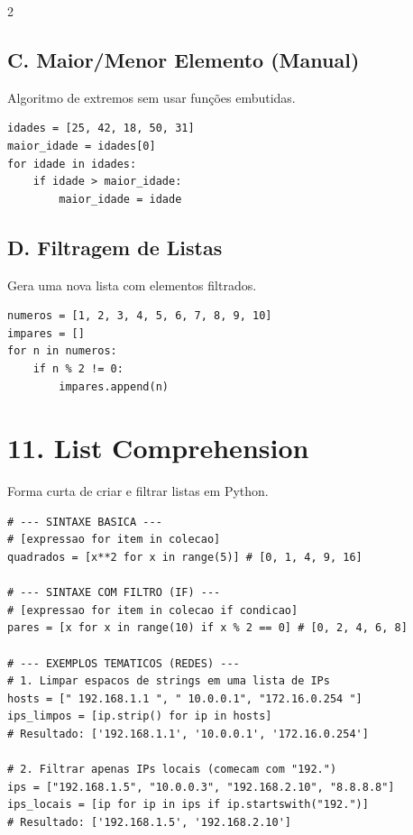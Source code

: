 \documentclass[10pt,a4paper]{article}
\begin{document}
\begin{multicols}{2}
\noindent
\begin{minipage}{\linewidth}
\subsection*{C. Maior/Menor Elemento (Manual)}
Algoritmo de extremos sem usar funções embutidas.
\begin{lstlisting}
idades = [25, 42, 18, 50, 31]
maior_idade = idades[0]
for idade in idades:
    if idade > maior_idade:
        maior_idade = idade
\end{lstlisting}
\end{minipage}
\vspace{0.3cm}

\noindent
\begin{minipage}{\linewidth}
\subsection*{D. Filtragem de Listas}
Gera uma nova lista com elementos filtrados.
\begin{lstlisting}
numeros = [1, 2, 3, 4, 5, 6, 7, 8, 9, 10]
impares = []
for n in numeros:
    if n % 2 != 0:
        impares.append(n)
\end{lstlisting}
\end{minipage}
\vspace{0.4cm}

\noindent
\begin{minipage}{\linewidth}
\section*{11. List Comprehension}
Forma curta de criar e filtrar listas em Python.
\begin{lstlisting}
# --- SINTAXE BASICA ---
# [expressao for item in colecao]
quadrados = [x**2 for x in range(5)] # [0, 1, 4, 9, 16]

# --- SINTAXE COM FILTRO (IF) ---
# [expressao for item in colecao if condicao]
pares = [x for x in range(10) if x % 2 == 0] # [0, 2, 4, 6, 8]

# --- EXEMPLOS TEMATICOS (REDES) ---
# 1. Limpar espacos de strings em uma lista de IPs
hosts = [" 192.168.1.1 ", " 10.0.0.1", "172.16.0.254 "]
ips_limpos = [ip.strip() for ip in hosts]
# Resultado: ['192.168.1.1', '10.0.0.1', '172.16.0.254']

# 2. Filtrar apenas IPs locais (comecam com "192.")
ips = ["192.168.1.5", "10.0.0.3", "192.168.2.10", "8.8.8.8"]
ips_locais = [ip for ip in ips if ip.startswith("192.")]
# Resultado: ['192.168.1.5', '192.168.2.10']
\end{lstlisting}
\end{minipage}

\end{multicols}
\end{document}
